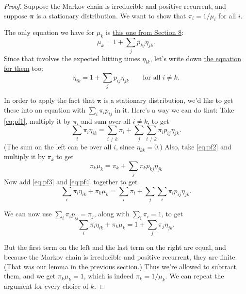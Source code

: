 \documentclass[
  a4paper,
]{article}
\theoremstyle{definition}
\theoremstyle{definition}
\theoremstyle{definition}
\theoremstyle{remark}
\begin{document}
\begin{proof}

Suppose the Markov chain is irreducible and positive recurrent, and suppose \(\boldsymbol\pi\) is a stationary distribution. We want to show that \(\pi_i = 1/\mu_i\) for all \(i\).

The only equation we have for \(\mu_k\) is \protect\hyperlink{S08-return-times}{this one from Section 8}:
\begin{equation}
\mu_k = 1 + \sum_j p_{kj} \eta_{jk} . \label{eq:pf2}
\end{equation}
Since that involves the expected hitting times \(\eta_{ik}\), let's write down \protect\hyperlink{S08-return-times}{the equation for them} too:
\begin{equation}
\eta_{ik} = 1 + \sum_j p_{ij} \eta_{jk} \qquad \text{for all $i \neq k$.} \label{eq:pf1}
\end{equation}

In order to apply the fact that \(\boldsymbol\pi\) is a stationary distribution, we'd like to get these into an equation with \(\sum_i \pi_i p_{ij}\) in it. Here's a way we can do that:
Take \eqref{eq:pf1}, multiply it by \(\pi_i\) and sum over all \(i \neq k\), to get
\begin{equation}
\sum_{i} \pi_i \eta_{ik} = \sum_{i \neq k} \pi_i + \sum_j \sum_{i \neq k} \pi_i p_{ij} \eta_{jk} . \label{eq:pf3}
\end{equation}
(The sum on the left can be over all \(i\), since \(\eta_{kk} = 0\).)
Also, take \eqref{eq:pf2} and multiply it by \(\pi_k\) to get
\begin{equation}
\pi_k \mu_k = \pi_k + \sum_j \pi_k p_{kj} \eta_{jk} \label{eq:pf4}
\end{equation}
Now add \eqref{eq:pf3} and \eqref{eq:pf4} together to get
\[
\sum_{i} \pi_i \eta_{ik} + \pi_k \mu_k = \sum_i \pi_i + \sum_j \sum_i\pi_i p_{ij} \eta_{jk} .
\]

We can now use \(\sum_i\pi_i p_{ij} = \pi_j\), along with \(\sum_i \pi_i = 1\), to get
\[ \sum_{i} \pi_i \eta_{ik} + \pi_k \mu_k = 1 + \sum_j \pi_j \eta_{jk} . \]

But the first term on the left and the last term on the right are equal, and because the Markov chain is irreducible and positive recurrent, they are finite. (That was \protect\hyperlink{S09-lemma}{our lemma in the previous section}.) Thus we're allowed to subtract them, and we get \(\pi_k \mu_k = 1\), which is indeed \(\pi_k = 1/\mu_k\). We can repeat the argument for every choice of \(k\).

\end{proof}
\end{document}
